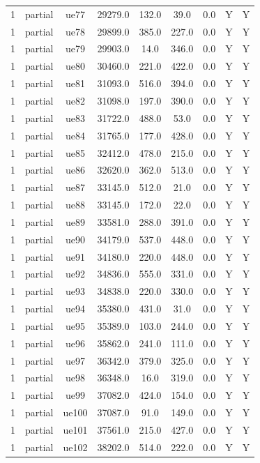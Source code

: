 \begin{table}[ht]
\begin{tabular}{|c|c|c|c|c|c|c|c|c|}
1 & partial & ue77 & 29279.0 & 132.0 & 39.0 & 0.0 & Y & Y \\
1 & partial & ue78 & 29899.0 & 385.0 & 227.0 & 0.0 & Y & Y \\
1 & partial & ue79 & 29903.0 & 14.0 & 346.0 & 0.0 & Y & Y \\
1 & partial & ue80 & 30460.0 & 221.0 & 422.0 & 0.0 & Y & Y \\
1 & partial & ue81 & 31093.0 & 516.0 & 394.0 & 0.0 & Y & Y \\
1 & partial & ue82 & 31098.0 & 197.0 & 390.0 & 0.0 & Y & Y \\
1 & partial & ue83 & 31722.0 & 488.0 & 53.0 & 0.0 & Y & Y \\
1 & partial & ue84 & 31765.0 & 177.0 & 428.0 & 0.0 & Y & Y \\
1 & partial & ue85 & 32412.0 & 478.0 & 215.0 & 0.0 & Y & Y \\
1 & partial & ue86 & 32620.0 & 362.0 & 513.0 & 0.0 & Y & Y \\
1 & partial & ue87 & 33145.0 & 512.0 & 21.0 & 0.0 & Y & Y \\
1 & partial & ue88 & 33145.0 & 172.0 & 22.0 & 0.0 & Y & Y \\
1 & partial & ue89 & 33581.0 & 288.0 & 391.0 & 0.0 & Y & Y \\
1 & partial & ue90 & 34179.0 & 537.0 & 448.0 & 0.0 & Y & Y \\
1 & partial & ue91 & 34180.0 & 220.0 & 448.0 & 0.0 & Y & Y \\
1 & partial & ue92 & 34836.0 & 555.0 & 331.0 & 0.0 & Y & Y \\
1 & partial & ue93 & 34838.0 & 220.0 & 330.0 & 0.0 & Y & Y \\
1 & partial & ue94 & 35380.0 & 431.0 & 31.0 & 0.0 & Y & Y \\
1 & partial & ue95 & 35389.0 & 103.0 & 244.0 & 0.0 & Y & Y \\
1 & partial & ue96 & 35862.0 & 241.0 & 111.0 & 0.0 & Y & Y \\
1 & partial & ue97 & 36342.0 & 379.0 & 325.0 & 0.0 & Y & Y \\
1 & partial & ue98 & 36348.0 & 16.0 & 319.0 & 0.0 & Y & Y \\
1 & partial & ue99 & 37082.0 & 424.0 & 154.0 & 0.0 & Y & Y \\
1 & partial & ue100 & 37087.0 & 91.0 & 149.0 & 0.0 & Y & Y \\
1 & partial & ue101 & 37561.0 & 215.0 & 427.0 & 0.0 & Y & Y \\
1 & partial & ue102 & 38202.0 & 514.0 & 222.0 & 0.0 & Y & Y \\

\end{tabular}
\end{table}
